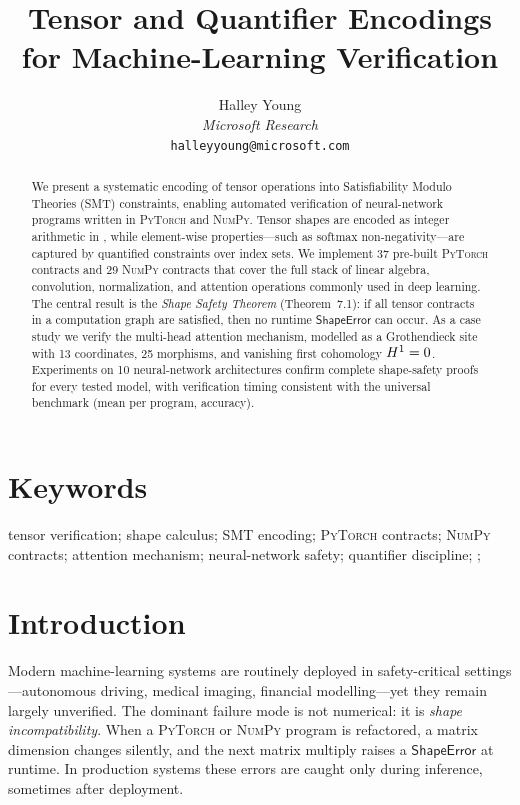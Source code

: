 \documentclass[11pt]{article}
\title{\textbf{Tensor and Quantifier Encodings\\
        for Machine-Learning Verification}}
\author{
  Halley Young\\
  \textit{Microsoft Research}\\
  \texttt{halleyyoung@microsoft.com}
}
\newcommand{\ShapeErr}{\ensuremath{\mathsf{ShapeError}}}        %
\newcommand{\PyTorch}{\textsc{PyTorch}\xspace}
\newcommand{\NumPy}{\textsc{NumPy}\xspace}
\begin{document}
\maketitle

\begin{abstract}
We present a systematic encoding of tensor operations into
Satisfiability Modulo Theories (SMT) constraints, enabling automated
verification of neural-network programs written in \PyTorch and \NumPy.
Tensor shapes are encoded as integer arithmetic in \QFLIA, while
element-wise properties---such as softmax non-negativity---are captured
by quantified constraints over index sets.  We implement 37 pre-built
\PyTorch contracts and 29 \NumPy contracts that cover the full stack of
linear algebra, convolution, normalization, and attention operations
commonly used in deep learning.
The central result is the \emph{Shape Safety Theorem} (Theorem~7.1):
if all tensor contracts in a computation graph are satisfied, then no
runtime \ShapeErr{} can occur.
As a case study we verify the multi-head attention mechanism, modelled
as a Grothendieck site with 13 coordinates, 25 morphisms, and
vanishing first cohomology $H^{1}=0$.
Experiments on 10 neural-network architectures confirm complete
shape-safety proofs for every tested model, with verification
timing consistent with the universal benchmark (mean \expTimeMean{}
per program, \expAccuracy{} accuracy).
\end{abstract}

\section*{Keywords}
tensor verification; shape calculus; SMT encoding; \PyTorch contracts;
\NumPy contracts; attention mechanism; neural-network safety;
quantifier discipline; \QFLIA; \JuGeo

\section{Introduction}
\label{sec:intro}

Modern machine-learning systems are routinely deployed in
safety-critical settings---autonomous driving, medical imaging,
financial modelling---yet they remain largely unverified.  The
dominant failure mode is not numerical: it is \emph{shape
incompatibility}.  When a \PyTorch or \NumPy program is refactored,
a matrix dimension changes silently, and the next matrix multiply
raises a \ShapeErr{} at runtime.  In production systems these errors
are caught only during inference, sometimes after deployment.
\end{document}

